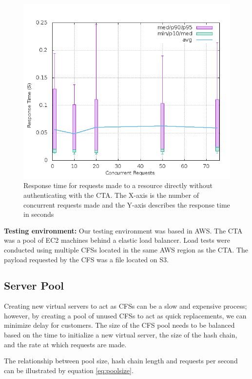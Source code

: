 \documentclass[a4paper,twoside]{article}
\begin{document}
\begin{figure}[h]
\includegraphics[width=\columnwidth]{direct_20s}
\caption{Response time for requests made to a resource directly without authenticating with the CTA. The X-axis is the number of concurrent requests made and the Y-axis describes the response time in seconds}
\label{fig:direct_20s}
\end{figure}

\textbf{Testing environment:}
Our testing environment was based in AWS. The CTA was a pool of EC2 machines behind a elastic load balancer. Load tests were conducted using multiple CFSs located in the same AWS region as the CTA. The payload requested by the CFS was a file located on S3.

\subsection{Server Pool}

Creating new virtual servers to act as CFSs can be a slow and expensive process; however, by creating a pool of unused CFSs to act as quick replacements, we can minimize delay for customers. The size of the CFS pool needs to be balanced based on the time to initialize a new virtual server, the size of the hash chain, and the rate at which requests are made.

The relationship between pool size, hash chain length and requests per second can be illustrated by equation \ref{eq:poolsize}.  
\end{document}
